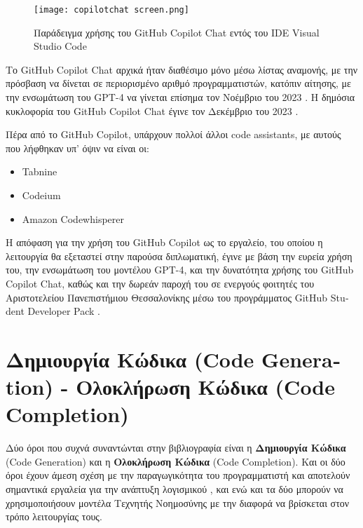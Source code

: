 \begin{figure}[H]
  \begin{center}
    \texttt{[image: copilotchat screen.png]}
    \label{fig:codeComp}
    \caption{Παράδειγμα χρήσης του \textlatin{GitHub Copilot Chat} εντός
      του \textlatin{IDE} \textlatin{Visual Studio Code}
      \cite{vscodeintro, vscode} }
  \end{center}
\end{figure}

Το \textlatin{GitHub Copilot Chat} αρχικά ήταν διαθέσιμο μόνο μέσω
λίστας αναμονής, με την πρόσβαση να δίνεται σε περιορισμένο αριθμό
προγραμματιστών, κατόπιν αίτησης, με την ενσωμάτωση του
\textlatin{GPT-4} να γίνεται επίσημα τον Νοέμβριο του 2023
\cite{github2023gpt4}. Η δημόσια κυκλοφορία του \textlatin{GitHub
  Copilot Chat} έγινε τον Δεκέμβριο του 2023 \cite{github2023chat}.

Πέρα από το \textlatin{GitHub Copilot}, υπάρχουν πολλοί άλλοι
\textlatin{code assistants}, με αυτούς που λήφθηκαν υπ' όψιν να είναι
οι:
\begin{itemize}
\item
  \textlatin{Tabnine} \cite{microsoft2021tabnine, vincent2019ai}
\item
  \textlatin{Codeium} \cite{forbes2024codeium}
\item
  \textlatin{Amazon Codewhisperer} \cite{bays2022AWS}
\end{itemize}
Η απόφαση για την χρήση του \textlatin{GitHub Copilot} ως το εργαλείο,
του οποίου η λειτουργία θα εξεταστεί στην παρούσα διπλωματική, έγινε με
βάση την ευρεία χρήση του, την ενσωμάτωση του μοντέλου
\textlatin{GPT-4}, και την δυνατότητα χρήσης του \textlatin{GitHub
  Copilot Chat}, καθώς και την δωρεάν παροχή του σε ενεργούς φοιτητές
του Αριστοτελείου Πανεπιστήμιου Θεσσαλονίκης μέσω του προγράμματος
\textlatin{GitHub Student Developer Pack} \cite{githubstudentpack}.

\section{Δημιουργία Κώδικα \textlatin{(Code Generation)} - Ολοκλήρωση
  Κώδικα \textlatin{(Code Completion)} }

\label{sec:ch1-}

Δύο όροι που συχνά συναντώνται στην βιβλιογραφία είναι η
\textbf{Δημιουργία Κώδικα} \textlatin{(Code Generation)} και η
\textbf{Ολοκλήρωση Κώδικα} \textlatin{(Code Completion)}. Και οι δύο
όροι έχουν άμεση σχέση με την παραγωγικότητα του προγραμματιστή και
αποτελούν σημαντικά εργαλεία για την ανάπτυξη λογισμικού \cite{codecomp,
  koester1996effect, asaduzzaman2014cscc}, και ενώ και τα δύο μπορούν να
χρησιμοποιήσουν μοντέλα Τεχνητής Νοημοσύνης
\cite{svyatkovskoy2020fast,raychev2014code} με την διαφορά να βρίσκεται
στον τρόπο λειτουργίας τους.

